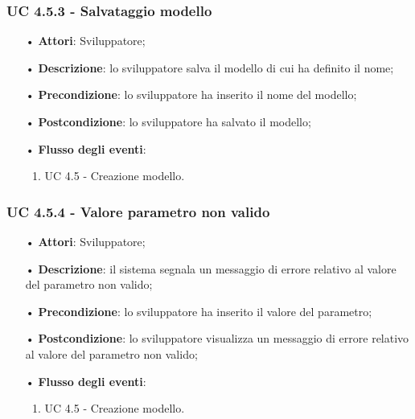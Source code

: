 \subsubsection{UC 4.5.3 - Salvataggio modello}
\begin{itemize}
\item[•]\textbf{Attori}: Sviluppatore;
\item[•]\textbf{Descrizione}: lo sviluppatore salva il modello di cui ha definito il nome;
\item[•]\textbf{Precondizione}: lo sviluppatore ha inserito il nome del modello;
\item[•]\textbf{Postcondizione}: lo sviluppatore ha salvato il modello;
\item[•]\textbf{Flusso degli eventi}: 
	\begin{enumerate}
	\item UC 4.5 - Creazione modello.
	\end{enumerate}
\end{itemize}

\subsubsection{UC 4.5.4 - Valore parametro non valido}
\begin{itemize}
\item[•]\textbf{Attori}: Sviluppatore;
\item[•]\textbf{Descrizione}: il sistema segnala un messaggio di errore relativo al valore del parametro non valido;
\item[•]\textbf{Precondizione}: lo sviluppatore ha inserito il valore del parametro;
\item[•]\textbf{Postcondizione}: lo sviluppatore visualizza un messaggio di errore relativo al valore del parametro non valido;
\item[•]\textbf{Flusso degli eventi}:
	\begin{enumerate}
	\item UC 4.5 - Creazione modello.
	\end{enumerate}
\end{itemize}

